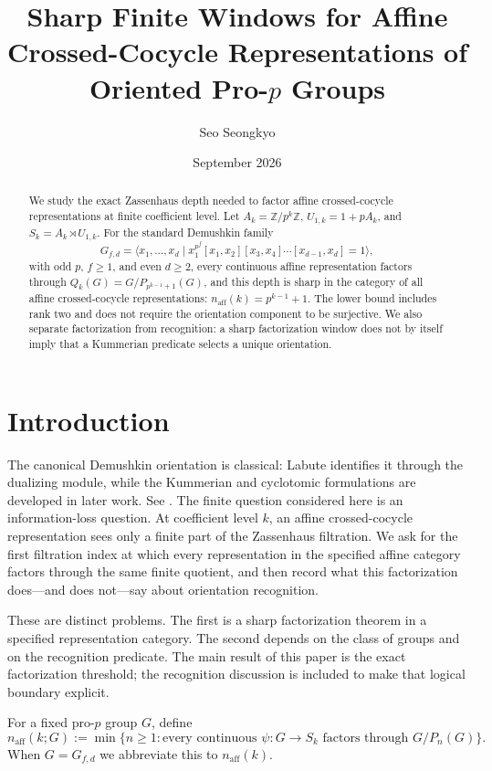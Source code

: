 \documentclass[11pt]{article}
\title{Sharp Finite Windows for Affine Crossed-Cocycle Representations of Oriented Pro-$p$ Groups}
\author{Seo Seongkyo}
\date{September 2026}
\begin{document}
\maketitle

\begin{abstract}
We study the exact Zassenhaus depth needed to factor affine crossed-cocycle representations at finite coefficient level. Let $A_k=\mathbb Z/p^k\mathbb Z$, $U_{1,k}=1+pA_k$, and $S_k=A_k\rtimes U_{1,k}$. For the standard Demushkin family
\[
G_{f,d}=\langle x_1,\ldots,x_d\mid x_1^{p^f}[x_1,x_2][x_3,x_4]\cdots[x_{d-1},x_d]=1\rangle,
\]
with odd $p$, $f\ge1$, and even $d\ge2$, every continuous affine representation factors through
$Q_k(G)=G/P_{p^{k-1}+1}(G)$, and this depth is sharp in the category of all affine crossed-cocycle representations:
$ n_{\mathrm{aff}}(k)=p^{k-1}+1$.
The lower bound includes rank two and does not require the orientation component to be surjective. We also separate factorization from recognition: a sharp factorization window does not by itself imply that a Kummerian predicate selects a unique orientation.
\end{abstract}

\section{Introduction}
The canonical Demushkin orientation is classical: Labute identifies it through the dualizing module, while the Kummerian and cyclotomic formulations are developed in later work. See \cite{Labute1967,EfratQuadrelli2019,QuadrelliWeigel2022}.
The finite question considered here is an information-loss question. At coefficient level $k$, an affine crossed-cocycle representation sees only a finite part of the Zassenhaus filtration. We ask for the first filtration index at which every representation in the specified affine category factors through the same finite quotient, and then record what this factorization does—and does not—say about orientation recognition.

These are distinct problems. The first is a sharp factorization theorem in a specified representation category. The second depends on the class of groups and on the recognition predicate. The main result of this paper is the exact factorization threshold; the recognition discussion is included to make that logical boundary explicit.

For a fixed pro-$p$ group $G$, define
\[
n_{\mathrm{aff}}(k;G):=\min\{n\ge1:\text{every continuous }\psi:G\to S_k\text{ factors through }G/P_n(G)\}.
\]
When $G=G_{f,d}$ we abbreviate this to $n_{\mathrm{aff}}(k)$.
\end{document}

